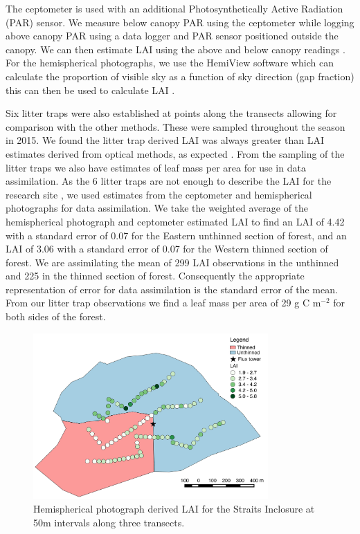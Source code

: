 \documentclass[draft,linenumbers]{agujournal}
\begin{document}
The ceptometer is used with an additional Photosynthetically Active Radiation (PAR) sensor. We measure below canopy PAR using the ceptometer while logging above canopy PAR using a data logger and PAR sensor positioned outside the canopy. We can then estimate LAI using the above and below canopy readings \citep{fassnacht1994comparison}. For the hemispherical photographs, we use the HemiView software \citep{rich1999hemiview} which can calculate the proportion of visible sky as a function of sky direction (gap fraction) this can then be used to calculate LAI  \citep{Jonckheere2004}.

Six litter traps were also established at points along the transects allowing for comparison with the other methods. These were sampled throughout the season in 2015. We found the litter trap derived LAI was always greater than LAI estimates derived from optical methods, as expected \citep{breda2003ground}. From the sampling of the litter traps we also have estimates of leaf mass per area for use in data assimilation. As the 6 litter traps are not enough to describe the LAI for the research site \citep{kimmins1973some}, we used estimates from the ceptometer and hemispherical photographs for data assimilation. We take the weighted average of the hemispherical photograph and ceptometer estimated LAI to find an LAI of 4.42 with a standard error of 0.07 for the Eastern unthinned section of forest, and an LAI of 3.06 with a standard error of 0.07 for the Western thinned section of forest. We are assimilating the mean of 299 LAI observations in the unthinned and 225 in the thinned section of forest. Consequently the appropriate representation of error for data assimilation is the standard error of the mean. From our litter trap observations we find a leaf mass per area of 29 g C m\(^{-2}\) for both sides of the forest.


\begin{figure}[ht]
    \centering
    \includegraphics[width=0.8\textwidth]{thinned.pdf}
    \caption{Hemispherical photograph derived LAI for the Straits Inclosure at 50m intervals along three transects.} \label{fig:hemi_lai}
\end{figure}
\end{document}
